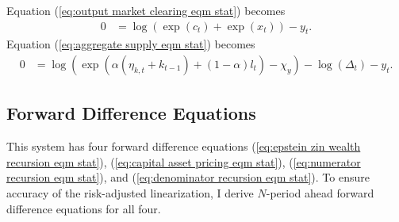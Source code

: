 \documentclass[12 pt, oneside]{article}
\theoremstyle{definition}
\theoremstyle{definition}
\theoremstyle{definition}
\begin{document}
Equation (\ref{eq:output market clearing eqm stat}) becomes
\begin{align*}
  0 & = \log(\exp(c_t) + \exp(x_t)) - y_t.
\end{align*}
Equation (\ref{eq:aggregate supply eqm stat}) becomes
\begin{align*}
  0 & = \log(\exp(\alpha(\eta_{k, t} + k_{t - 1}) + (1 - \alpha) l_t) - \chi_y) - \log(\Delta_t) - y_t.
\end{align*}

\subsection{Forward Difference Equations}

This system has four forward difference equations (\ref{eq:epstein zin wealth recursion eqm stat}), (\ref{eq:capital asset pricing eqm stat}), (\ref{eq:numerator recursion eqm stat}), and
(\ref{eq:denominator recursion eqm stat}). To ensure accuracy of the risk-adjusted linearization, I derive $N$-period ahead forward difference equations for all four.\\
\end{document}
